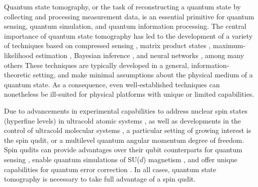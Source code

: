 \documentclass[notitlepage,twocolumn]{revtex4-2}
\begin{document}
Quantum state tomography, or the task of reconstructing a quantum state by collecting and processing measurement data, is an essential primitive for quantum sensing, quantum simulation, and quantum information processing.
The central importance of quantum state tomography has led to the development of a variety of techniques based on compressed sensing \cite{gross2010quantum}, matrix product states \cite{cramer2010efficient}, maximum-likelihood estimation \cite{smolin2012efficient}, Bayesian inference \cite{huszar2012adaptive}, and neural networks \cite{torlai2018neuralnetwork}, among many others \cite{christandl2012reliable, qi2013quantum, opatrny1997leastsquares}
These techniques are typically developed in a general, information-theoretic setting, and make minimal assumptions about the physical medium of a quantum state.
As a consequence, even well-established techniques can nonetheless be ill-suited for physical platforms with unique or limited capabilities.

Due to advancements in experimental capabilities to address nuclear spin states (hyperfine levels) in ultracold atomic systems \cite{daley2011quantum, smith2013quantum, cazalilla2014ultracold}, as well as developments in the control of ultracold molecular systems \cite{bohn2017cold, zeppenfeld2012sisyphus, kozyryev2017sisyphus, puri2017synthesis, wu2017cryofuge, marco2019degenerate, liu2019molecular, anderegg2019optical, chou2020frequencycomb, lin2020quantum}, a particular setting of growing interest is the spin qudit, or a multilevel quantum angular momentum degree of freedom.
Spin qudits can provide advantages over their qubit counterparts for quantum sensing \cite{hemmer2018squeezing, evrard2019enhanced}, enable quantum simulations of SU($d$) magnetism \cite{cazalilla2014ultracold, banerjee2013atomic, zhang2014spectroscopic, scazza2014observation, goban2018emergence}, and offer unique capabilities for quantum error correction \cite{albert2020robust, gross2020encoding}.
In all cases, quantum state tomography is necessary to take full advantage of a spin qudit.
\end{document}
